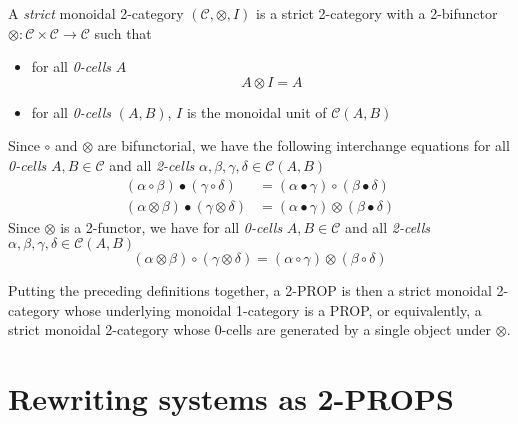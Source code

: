 \documentclass[a4paper]{article}
\begin{document}
\begin{definition}\label{def:monoidal-two-cat}
  A \emph{strict} monoidal 2-category $(\mathcal{C}, \otimes, I)$ is a
  strict 2-category with a 2-bifunctor $\otimes: \mathcal{C} \times
  \mathcal{C} \to \mathcal{C}$ such that
  \begin{itemize}
    \item for all \emph{0-cells} $A$
      \[
        A \otimes I = A
      \]
    \item for all \emph{0-cells} $(A, B)$, $I$ is the monoidal unit of
    $\mathcal{C}(A, B)$
  \end{itemize}
\end{definition}


\begin{remark}
  Since $\circ$ and $\otimes$ are bifunctorial, we have the following
    interchange equations for all \emph{0-cells} $A, B \in \mathcal{C}$ and all
    \emph{2-cells} $\alpha, \beta, \gamma, \delta \in \mathcal{C}(A, B)$
  \begin{align}
    (\alpha \circ \beta) \bullet (\gamma \circ \delta) &= (\alpha \bullet
      \gamma) \circ (\beta \bullet \delta) \\
    (\alpha \otimes \beta) \bullet (\gamma \otimes \delta) &= (\alpha \bullet
      \gamma) \otimes (\beta \bullet \delta)
  \end{align}
  Since $\otimes$ is a 2-functor, we have for all \emph{0-cells} $A, B \in
    \mathcal{C}$ and all \emph{2-cells} $\alpha, \beta, \gamma, \delta \in
    \mathcal{C}(A, B)$
  \[
    (\alpha \otimes \beta) \circ (\gamma \otimes \delta) = (\alpha \circ \gamma)
      \otimes (\beta \circ \delta)
  \]
\end{remark}

Putting the preceding definitions together, a 2-PROP is then a strict
monoidal 2-category whose underlying monoidal 1-category is a PROP, or
equivalently, a strict monoidal 2-category whose 0-cells are generated
by a single object under $\otimes$.


\section{Rewriting systems as 2-PROPS}
\label{sec:rewriting}
\end{document}
